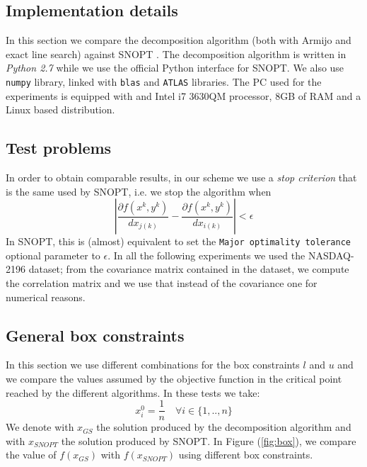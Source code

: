 
\subsection{Implementation details}
In this section we compare the decomposition algorithm (both with Armijo and exact line search) against SNOPT \cite{snopt}.
The decomposition algorithm is written in \textit{Python 2.7} while we use the official Python interface for SNOPT. We also use \texttt{numpy} library, linked with \texttt{blas} and \texttt{ATLAS} libraries. The PC used for the experiments is equipped with and Intel i7 3630QM processor, 8GB of RAM and a Linux based distribution.\\

\subsection{Test problems}
In order to obtain comparable results, in our scheme we use a \textit{stop criterion} that is the same used by SNOPT, i.e. we stop the algorithm when
\begin{equation}\label{eq:stop}
\left| \frac{\partial f(x^k,y^k)}{d{x_{j(k)}}} - \frac{\partial f(x^k,y^k)}{d{x_{i(k)}} }\right| < \epsilon
\end{equation}
In SNOPT, this is (almost) equivalent to set the \texttt{Major optimality tolerance} optional parameter to $\epsilon$. 
In all the following experiments we used the NASDAQ-2196 dataset\footnotemark[1]; from the covariance matrix contained in the dataset, we compute the correlation matrix and we use that instead of the covariance one for numerical reasons. 

\subsection{General box constraints}
In this section we use different combinations for the box constraints $l$ and $u$ and we compare the values assumed by the objective function in the critical point reached by the different algorithms. In these tests we take:
\begin{equation}
x_i^0 = \frac{1}{n} \quad \forall i \in \{1, .., n \}
\end{equation}
We denote with $x_{GS}$ the solution produced by the decomposition algorithm and with $x_{SNOPT}$ the solution produced by SNOPT. In Figure (\ref{fig:box}), we compare the value of $f(x_{GS})$ with $f(x_{SNOPT})$ using different box constraints.

